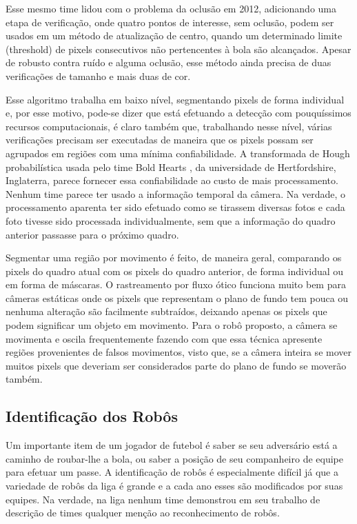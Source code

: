 Esse mesmo time lidou com o problema da oclusão em 2012, adicionando uma etapa de verificação, onde quatro pontos de interesse, sem oclusão, podem ser usados em um método de atualização de centro, quando um determinado limite (threshold) de pixels consecutivos não pertencentes à bola são alcançados. Apesar de robusto contra ruído e alguma oclusão, esse método ainda precisa de duas verificações de tamanho e mais duas de cor. 

Esse algoritmo trabalha em baixo nível, segmentando pixels de forma individual e, por esse motivo, pode-se dizer que está efetuando a detecção com pouquíssimos recursos computacionais, é claro também que, trabalhando nesse nível, várias verificações precisam ser executadas de maneira que os pixels possam ser agrupados em regiões com uma mínima confiabilidade. A transformada de Hough probabilística usada pelo time Bold Hearts , da universidade de Hertfordshire, Inglaterra, parece fornecer essa confiabilidade ao custo de mais processamento. Nenhum time parece ter usado a informação temporal da câmera. Na verdade, o processamento aparenta ter sido efetuado como se tirassem diversas fotos e cada foto tivesse sido processada individualmente, sem que a informação do quadro anterior passasse para o próximo quadro.

Segmentar uma região por movimento é feito, de maneira geral, comparando os pixels do quadro atual com os pixels do quadro anterior, de forma individual ou em forma de máscaras. O rastreamento por fluxo ótico \cite{Fleet} funciona muito bem para câmeras estáticas onde os pixels que representam o plano de fundo tem pouca ou nenhuma alteração são facilmente subtraídos, deixando apenas os pixels que podem significar um objeto em movimento. Para o robô proposto, a câmera se movimenta e oscila frequentemente fazendo com que essa técnica apresente regiões provenientes de falsos movimentos, visto que, se a câmera inteira se mover muitos pixels que deveriam ser considerados parte do plano de fundo se moverão também.


\subsection{Identificação dos Robôs}

Um importante item de um jogador de futebol é saber se seu adversário está a caminho de roubar-lhe a bola, ou saber a posição de seu companheiro de equipe para efetuar um passe. A identificação de robôs é especialmente difícil já que a variedade de robôs da liga é grande e a cada ano esses são modificados por suas equipes. Na verdade, na liga nenhum time demonstrou em seu trabalho de descrição de times qualquer menção ao reconhecimento de robôs.

